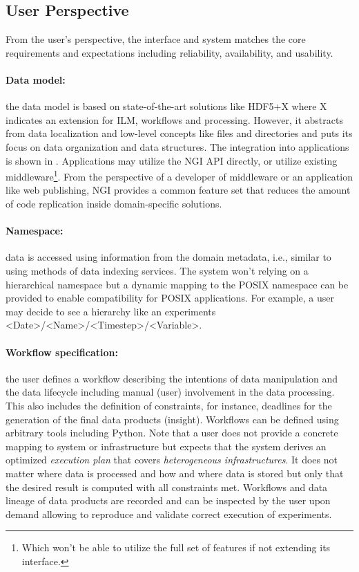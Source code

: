\documentclass[a4paper, twocolumn]{article}
\begin{document}
\subsection{User Perspective}

\newcommand{\bnf}[1]{\textless #1\textgreater}

From the user's perspective, the interface and system matches the core requirements and expectations including reliability, availability, and usability.

\paragraph{Data model:} the data model is based on state-of-the-art solutions like HDF5+X where X indicates an extension for ILM, workflows and processing.
However, it abstracts from data localization and low-level concepts like files and directories and puts its focus on data organization and data structures.
The integration into applications is shown in .
Applications may utilize the NGI API directly, or utilize existing middleware\footnote{Which won't be able to utilize the full set of features if not extending its interface.}.
From the perspective of a developer of middleware or an application like web publishing, NGI provides a common feature set that reduces the amount of code replication inside domain-specific solutions.


\paragraph{Namespace:} data is accessed using information from the domain metadata, i.e., similar to using methods of data indexing services.
The system won't relying on a hierarchical namespace but a dynamic mapping to the POSIX namespace can be provided to enable compatibility for POSIX applications.
For example, a user may decide to see a hierarchy like an experiments \bnf{Date}/\bnf{Name}/\bnf{Timestep}/\bnf{Variable}.

\paragraph{Workflow specification:} the user defines a workflow describing the intentions of data manipulation and the data lifecycle including manual (user) involvement in the data processing.
This also includes the definition of constraints, for instance, deadlines for the generation of the final data products (insight).
Workflows can be defined using arbitrary tools including Python.
Note that a user does not provide a concrete mapping to system or infrastructure but expects that the system derives an optimized \textit{execution plan} that covers \textit{heterogeneous infrastructures}.
It does not matter where data is processed and how and where data is stored but only that the desired result is computed with all constraints met.
Workflows and data lineage of data products are recorded and can be inspected by the user upon demand allowing to reproduce and validate correct execution of experiments.
\end{document}
